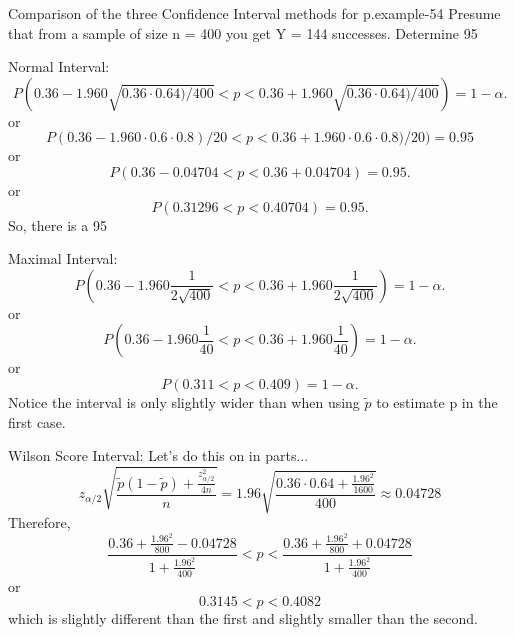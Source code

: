 \documentclass[10pt,]{book}
\numberwithin{equation}{section}
\newcommand{\lt}{<}
\begin{document}
\begin{example}{Comparison of the three Confidence Interval methods for p.}{example-54}%
\hypertarget{p-1356}{}%
Presume that from a sample of size n = 400 you get Y = 144 successes.  Determine 95%
\par
\hypertarget{p-1357}{}%
Normal Interval:%
\begin{equation*}
P( 0.36 - 1.960 \sqrt{0.36 \cdot 0.64) / 400} \lt  p \lt 0.36 + 1.960 \sqrt{0.36 \cdot 0.64) / 400}) = 1 - \alpha.
\end{equation*}
or%
\begin{equation*}
P( 0.36 - 1.960 \cdot 0.6 \cdot 0.8) / 20 \lt  p \lt 0.36 + 1.960 \cdot 0.6 \cdot 0.8) / 20) = 0.95 
\end{equation*}
or%
\begin{equation*}
P( 0.36 - 0.04704 \lt  p \lt 0.36 + 0.04704) = 0.95 .
\end{equation*}
or%
\begin{equation*}
P( 0.31296 \lt  p \lt 0.40704) = 0.95 .
\end{equation*}
So, there is a 95%
\par
\hypertarget{p-1358}{}%
Maximal Interval:%
\begin{equation*}
P( 0.36 - 1.960 \frac{1}{2\sqrt{400}} \lt  p \lt 0.36 + 1.960 \frac{1}{2\sqrt{400}} ) = 1 - \alpha.
\end{equation*}
or%
\begin{equation*}
P( 0.36 - 1.960 \frac{1}{40} \lt  p \lt 0.36 + 1.960 \frac{1}{40} ) = 1 - \alpha.
\end{equation*}
or%
\begin{equation*}
P( 0.311 \lt  p \lt 0.409 ) = 1 - \alpha.
\end{equation*}
Notice the interval is only slightly wider than when using \(\tilde{p}\) to estimate p in the first case.%
\par
\hypertarget{p-1359}{}%
Wilson Score Interval:  Let's do this on in parts...%
\begin{equation*}
z_{\alpha/2} \sqrt{\frac{\tilde{p}(1-\tilde{p}) + \frac{z_{\alpha/2}^2}{4n}}{n}} = 1.96 \sqrt{ \frac{0.36 \cdot 0.64 + \frac{1.96^2}{1600}}{400}} \approx 0.04728
\end{equation*}
Therefore,%
\begin{equation*}
\frac{0.36 + \frac{1.96^2}{800} - 0.04728}{1 + \frac{1.96^2}{400}} \lt p \lt \frac{0.36 + \frac{1.96^2}{800} + 0.04728}{1 + \frac{1.96^2}{400}}
\end{equation*}
or%
\begin{equation*}
0.3145 \lt p \lt 0.4082
\end{equation*}
which is slightly different than the first and slightly smaller than the second.%
\end{example}
\end{document}
